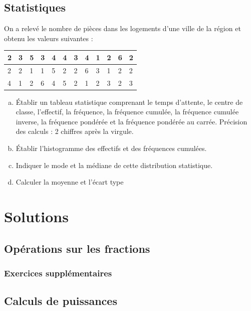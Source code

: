 \documentclass[twoside, a4paper, 12pt, openright, fullpage]{book}
\begin{document}
\section{Statistiques}
\begin{exercice}
On a relevé le nombre de pièces dans les logements d’une ville de la région et obtenu les valeurs suivantes :
\begin{center}
\begin{tabular}{|l|l|l|l|l|l|l|l|l|l|l|l|}
\hline
2&3&5&3&4&4&3&4&1&2&6&2 \\ \hline
2&2&1&1&5&2&2&6&3&1&2&2     \\ \hline
4&1&2&6&4&5&2&1&2&3&2&3    \\ \hline
\end{tabular}
\end{center}

\begin{enumerate}[(a)]
\item Établir un tableau statistique comprenant le temps d'attente, le centre de classe, l’effectif, la fréquence, la fréquence cumulée, la fréquence cumulée inverse, la fréquence pondérée et la fréquence pondérée au carrée.
Précision des calculs : 2 chiffres après la virgule.
\item Établir l'histogramme des effectifs et des fréquences cumulées.
\item Indiquer le mode et la médiane de cette distribution statistique.
\item Calculer la moyenne et l'écart type

\end{enumerate}
\end{exercice}


\chapter{Solutions}
\section{Opérations sur les fractions}
\subsection{Exercices supplémentaires}

\section{Calculs de puissances}
\end{document}
